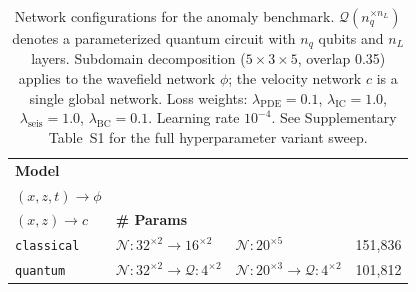 \documentclass[11pt,a4paper]{article}
\begin{document}
\begin{table}[h]
\centering
\caption{Network configurations for the anomaly benchmark. $\mathcal{Q}(n_q^{\times n_L})$ denotes a parameterized quantum circuit with $n_q$ qubits and $n_L$ layers. Subdomain decomposition ($5\!\times\!3\!\times\!5$, overlap 0.35) applies to the wavefield network $\phi$; the velocity network $c$ is a single global network. Loss weights: $\lambda_\text{PDE}\!=\!0.1$, $\lambda_\text{IC}\!=\!1.0$, $\lambda_\text{seis}\!=\!1.0$, $\lambda_\text{BC}\!=\!0.1$. Learning rate $10^{-4}$. See Supplementary Table~S1 for the full hyperparameter variant sweep.}
\label{tab:hyperparams_main}
\begin{tabular}{l l l r}
\toprule
\textbf{Model} & \makecell[l]{$\boldsymbol{\phi}$ \textbf{network}\\$(x,z,t)\!\to\!\phi$} & \makecell[l]{$\boldsymbol{c}$ \textbf{network}\\$(x,z)\!\to\!c$} & \textbf{\# Params} \\
\midrule
\texttt{classical} & $\mathcal{N}\!: 32^{\times 2}\!\to\!16^{\times 2}$ & $\mathcal{N}\!: 20^{\times 5}$ & 151{,}836 \\
\texttt{quantum}   & $\mathcal{N}\!: 32^{\times 2}\!\to\!\mathcal{Q}\!: 4^{\times 2}$ & $\mathcal{N}\!: 20^{\times 3}\!\to\!\mathcal{Q}\!: 4^{\times 2}$ & 101{,}812 \\
\bottomrule
\end{tabular}
\end{table}
\end{document}
